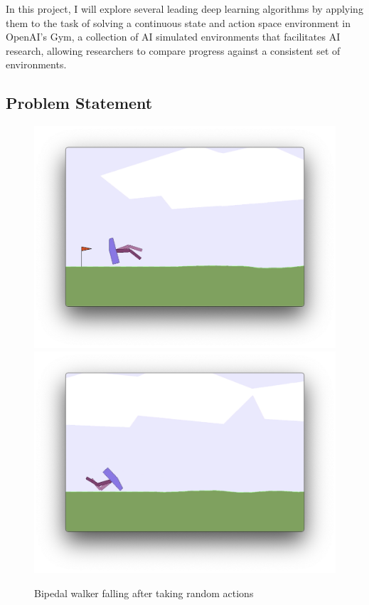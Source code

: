 \documentclass{article}
\begin{document}
In this project, I will explore several leading deep learning algorithms by applying them to the task of solving a continuous state and action space environment in OpenAI's Gym, a collection of AI simulated environments that facilitates AI research, allowing researchers to compare progress against a consistent set of environments. 


\subsection{Problem Statement}
\begin{figure}[h]
\caption{Bipedal walker falling after taking random actions}
\centering
\includegraphics[scale=0.25]{images/bipedal-fall-backward.png}
\includegraphics[scale=0.25]{images/bipedal-fall-forward.png}

\end{figure}
\end{document}
